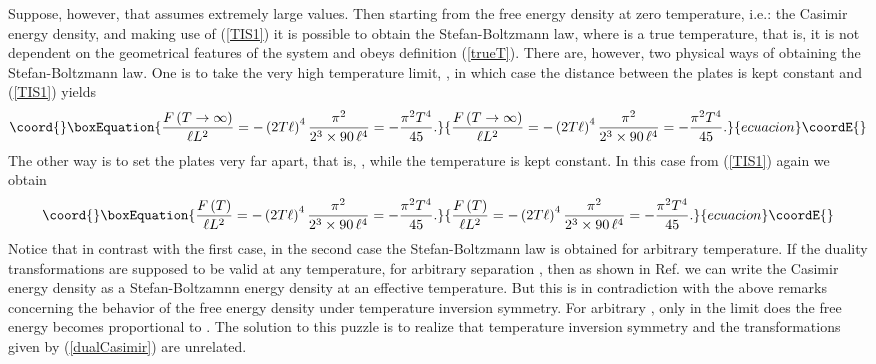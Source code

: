 \documentclass[a4paper,12pt]{article}
\begin{document}
Suppose, however, that \myHighlight{$\xi$}\coordHE{} assumes extremely large values. Then starting from the free energy density at zero temperature, i.e.: the Casimir energy density, and making use of (\ref{TIS1}) it is possible to obtain the Stefan-Boltzmann \coordHE{} law, where \coordHE{} is a true temperature, that is, it is not dependent on the geometrical features of the system and obeys definition (\ref{trueT}). There are, however, two physical ways of obtaining the Stefan-Boltzmann law. One is to take the very high temperature limit, \coordHE{}, in which case the distance between the plates is kept constant and (\ref{TIS1})  yields
%
\begin{equation}\coord{}\boxEquation{
\frac{F\left(T\to\infty\right)}{\ell L^2}=-\left(2T\ell\right)^4\frac{\pi^2}{2^3\times90\,\ell^4}=-\frac{\pi^2T^4}{45}.
}{
\frac{F\left(T\to\infty\right)}{\ell L^2}=-\left(2T\ell\right)^4\frac{\pi^2}{2^3\times90\,\ell^4}=-\frac{\pi^2T^4}{45}.
}{ecuacion}\coordE{}\end{equation}
%
The other way is to set the plates very far apart, that is, \myHighlight{$\ell\to\infty$}\coordHE{}, while the temperature is kept constant. In this case from (\ref{TIS1}) again we obtain
%
\begin{equation}\coord{}\boxEquation{
\frac{F\left(T\right)}{\ell L^2}=-\left(2T\ell\right)^4\frac{\pi^2}{2^3\times90\,\ell^4}=-\frac{\pi^2T^4}{45}.
}{
\frac{F\left(T\right)}{\ell L^2}=-\left(2T\ell\right)^4\frac{\pi^2}{2^3\times90\,\ell^4}=-\frac{\pi^2T^4}{45}.
}{ecuacion}\coordE{}\end{equation}
%
Notice that in contrast with the first case, in the second case the Stefan-Boltzmann law is obtained for arbitrary temperature. If the duality transformations are supposed to be valid at any temperature, for arbitrary separation \myHighlight{$\ell$}\coordHE{}, then as shown in Ref. \cite{Fukushima&Ohta2001} we can write the Casimir energy density as a Stefan-Boltzamnn energy density at an effective temperature. But this is in contradiction with the above remarks concerning the behavior of the free energy density under temperature inversion symmetry. For arbitrary \coordHE{}, only in the limit \myHighlight{$\ell\to\infty$}\coordHE{} does the free energy becomes proportional to \coordHE{}. The solution to this puzzle is to realize that temperature inversion symmetry and the transformations given by (\ref{dualCasimir}) are unrelated.
 
\end{document}
